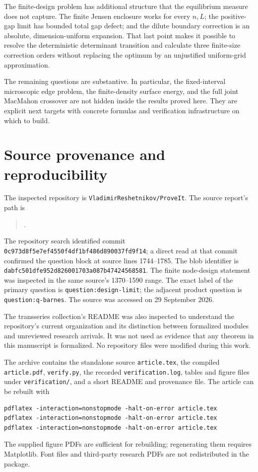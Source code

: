 \documentclass[11pt,a4paper]{article}
\theoremstyle{definition}
\theoremstyle{remark}
\begin{document}
The finite-design problem has additional structure that the equilibrium
measure does not capture. The finite Jensen enclosure works for every
$n,L$; the positive-gap limit has bounded total gap defect; and the dilute
boundary correction is an absolute, dimension-uniform expansion. That
last point makes it possible to resolve the deterministic determinant
transition and calculate three finite-size correction orders without
replacing the optimum by an unjustified uniform-grid approximation.

The remaining questions are substantive. In particular, the fixed-interval
microscopic edge problem, the finite-density surface energy, and the full
joint MacMahon crossover are not hidden inside the results proved here.
They are explicit next targets with concrete formulas and verification
infrastructure on which to build.

\appendix
\section{Source provenance and reproducibility}
\label{sec:provenance}

The inspected repository is \texttt{VladimirReshetnikov/ProveIt}.
The source report's path is
\begin{quote}\small\raggedright
{}.
\end{quote}
The repository search identified commit
\texttt{0c973d8f5e7ef4550f4df1bf486d890037fd9f14}; a direct read at that
commit confirmed the question block at source lines 1744--1785. The blob
identifier is \texttt{dabfc501dfe952d826001703a087b47424568581}.
The finite node-design statement was inspected in the same source's
1370--1590 range. The exact label of the primary question is
\texttt{question:design-limit}; the adjacent product question is
\texttt{question:q-barnes}. The source was accessed on 29 September 2026.

The transseries collection's README was also inspected to understand the
repository's current organization and its distinction between formalized
modules and unreviewed research arrivals. It was not used as evidence
that any theorem in this manuscript is formalized. No repository files
were modified during this work.

The archive contains the standalone source \texttt{article.tex}, the
compiled \texttt{article.pdf}, \texttt{verify.py}, the recorded
\texttt{verification.log}, tables and figure files under
\texttt{verification/}, and a short README and provenance file. The
article can be rebuilt with
\begin{verbatim}
pdflatex -interaction=nonstopmode -halt-on-error article.tex
pdflatex -interaction=nonstopmode -halt-on-error article.tex
pdflatex -interaction=nonstopmode -halt-on-error article.tex
\end{verbatim}
The supplied figure PDFs are sufficient for rebuilding; regenerating them
requires Matplotlib. Font files and third-party research PDFs are not
redistributed in the package.
\end{document}
